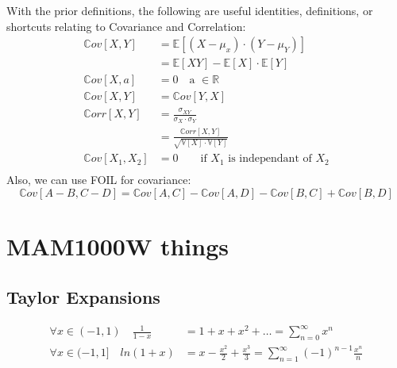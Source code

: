 With the prior definitions, the following are useful identities, definitions,
or shortcuts relating to Covariance and Correlation:
\begin{equation*}
    \begin{aligned}
        \mathbb{C}ov[X, Y] &= \mathbb{E}[(X - \mu_x)\cdot(Y - \mu_Y)] \\
                  &= \mathbb{E}[XY] - \mathbb{E}[X] \cdot \mathbb{E}[Y] \\
        \mathbb{C}ov[X, a] &= 0 \quad \text{a } \in \mathbb{R} \\
        \mathbb{C}ov[X, Y] &= \mathbb{C}ov[Y, X] \\
        \mathbb{C}orr[X, Y] &= \frac{\sigma_{XY}}{\sigma_X \cdot \sigma_Y}\\
            &= \frac{ \mathbb{C}orr[X, Y] }{ \sqrt{ \mathbb{V}[X] \cdot \mathbb{V}[Y] }} \\
        \mathbb{C}ov[X_1, X_2] &= 0 \qquad \text{if $X_1$ is independant of
        $X_2$}\\
    \end{aligned}
\end{equation*}
Also, we can use FOIL for covariance:
\begin{equation*}
    \mathbb{C}ov\left[A - B, C - D\right] = \mathbb{C}ov\left[A, C\right] -
    \mathbb{C}ov\left[A, D\right] - \mathbb{C}ov\left[B, C\right] +
    \mathbb{C}ov\left[B, D\right] 
\end{equation*}
    

\section{MAM1000W things}
\subsection{Taylor Expansions}
\begin{equation*}
    \begin{aligned}
        \forall x\in(-1,1)\quad \frac{1}{1-x} &= 1 + x + x^{2} + \dots = \sum_{n=0}^{\infty} x^{n} \\
        \forall x\in(-1,1]\quad ln(1+x) &= x - \frac{x^{2}}{2} + \frac{x^{3}}{3} = \sum_{n=1}^{\infty} (-1)^{n-1}\frac{x^{n}}{n} \\
    \end{aligned}
\end{equation*}





